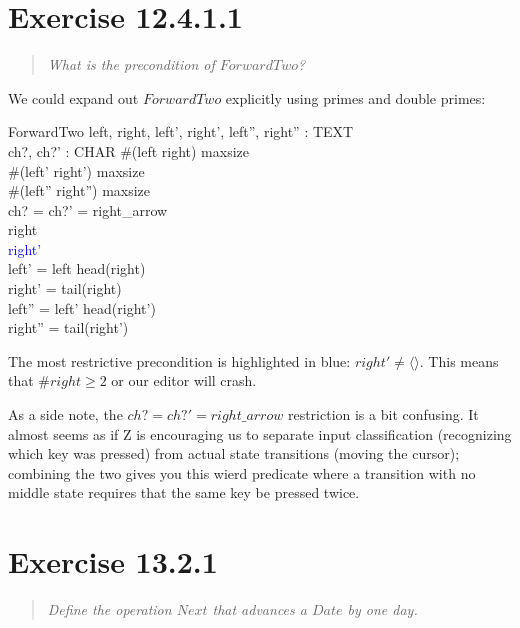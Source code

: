 \documentclass[10pt]{article}
\begin{document}
\section{Exercise 12.4.1.1}
\begin{quote}
  {\it
   What is the precondition of $ForwardTwo$? 
  }
\end{quote}

We could expand out $ForwardTwo$ explicitly using primes and double primes:

\begin{schema}{ForwardTwo}
  left, right, left', right', left'', right'' : TEXT \\
  ch?, ch?' : CHAR
  \where
  \#(left \cat right) \leq maxsize\\
  \#(left' \cat right') \leq maxsize\\
  \#(left'' \cat right'') \leq maxsize\\
  ch? = ch?' = right\_arrow \\
  right \neq \langle \rangle \\
  \textcolor{blue}{right' \neq \langle \rangle} \\
  left' = left \cat \langle head(right)\rangle \\
  right' = tail(right) \\
  left'' = left' \cat \langle head(right')\rangle \\
  right'' = tail(right') \\
\end{schema}

The most restrictive precondition is highlighted in blue: $right' \neq \langle \rangle$.  This means
that $\#right \geq 2$ or our editor will crash.

As a side note, the $ch? = ch?' = right\_arrow$ restriction is a bit confusing.  It almost seems as
if Z is encouraging us to separate input classification (recognizing which key was pressed) from
actual state transitions (moving the cursor); combining the two gives you this wierd predicate where
a transition with no middle state requires that the same key be pressed twice.

\tocheck



\section{Exercise 13.2.1}
\begin{quote}
  {\it
    Define the operation $Next$ that advances a $Date$ by one day.
  }
\end{quote}
\end{document}
